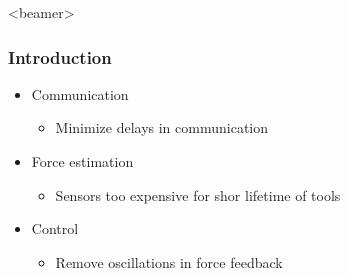 \begin{frame}<beamer>
\frametitle{Introduction}
\begin{itemize}
\item Communication
\begin{itemize}
\item Minimize delays in communication
\end{itemize}
\item Force estimation
\begin{itemize}
\item Sensors too expensive for shor lifetime of tools
\end{itemize}
\item Control
\begin{itemize}
\item Remove oscillations in force feedback
\end{itemize}
\end{itemize}
\end{frame}